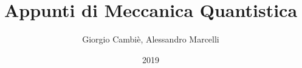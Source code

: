 \documentclass[a4paper,12pt]{book}
\begin{document}
\author{Giorgio Cambiè, Alessandro Marcelli}
\title{Appunti di Meccanica Quantistica}
\date{2019}



\frontmatter
\maketitle
\tableofcontents
 
\mainmatter








\backmatter
\end{document}

